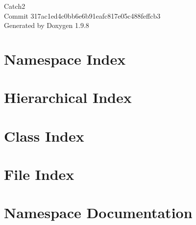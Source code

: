 \documentclass[twoside]{book}
\newcommand{\+}{\discretionary{\mbox{\scriptsize$\hookleftarrow$}}{}{}}
\newcommand{\clearemptydoublepage}{%
    \newpage{\pagestyle{empty}\cleardoublepage}%
  }
\begin{document}
  \raggedbottom
    \hypersetup{pageanchor=false,
                bookmarksnumbered=true,
                pdfencoding=unicode
               }
  \begin{titlepage}
  \vspace*{7cm}
  \begin{center}%
  {\Large Catch2}\\
  [1ex]\large Commit 317ac1ed4c0bb6e6b91eafc817e05c488feffcb3 \\
  \vspace*{1cm}
  {\large Generated by Doxygen 1.9.8}\\
  \end{center}
  \end{titlepage}
  \clearemptydoublepage
  \tableofcontents
  \clearemptydoublepage
  \hypersetup{pageanchor=true}
\chapter{Namespace Index}

\chapter{Hierarchical Index}

\chapter{Class Index}

\chapter{File Index}

\chapter{Namespace Documentation}














\end{document}
